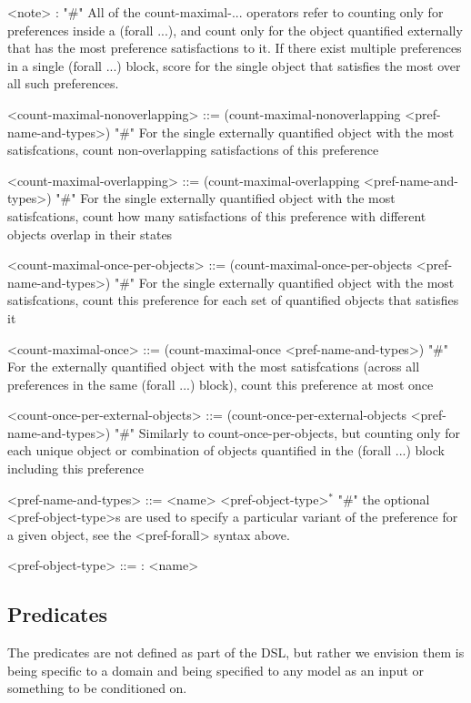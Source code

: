 \documentclass{article}
\begin{document}
\begin{grammar}
<note> : "#" All of the count-maximal-... operators refer to counting only for preferences inside a (forall ...), and count only for the object quantified externally that has the most preference satisfactions to it. If there exist multiple preferences in a single (forall ...) block, score for the single object that satisfies the most over all such preferences.

<count-maximal-nonoverlapping> ::= (count-maximal-nonoverlapping <pref-name-and-types>) "#" For the single externally quantified object with the most satisfcations, count non-overlapping satisfactions of this preference

{ \color{teal} <count-maximal-overlapping> ::= (count-maximal-overlapping <pref-name-and-types>) "#" For the single externally quantified object with the most satisfcations, count how many satisfactions of this preference with different objects overlap in their states }

<count-maximal-once-per-objects> ::= (count-maximal-once-per-objects <pref-name-and-types>) "#" For the single externally quantified object with the most satisfcations, count this preference for each set of quantified objects that satisfies it

<count-maximal-once> ::= (count-maximal-once <pref-name-and-types>) "#" For the externally quantified object with the most satisfcations (across all preferences in the same (forall ...) block), count this preference at most once

{ \color{teal} <count-once-per-external-objects> ::=  (count-once-per-external-objects <pref-name-and-types>) "#" Similarly to count-once-per-objects, but counting only for each unique object or combination of objects quantified in the (forall ...) block including this preference }

<pref-name-and-types> ::= <name> <pref-object-type>$^*$ "#" the optional <pref-object-type>s are used to specify a particular variant of the preference for a given object, see the <pref-forall> syntax above.

    <pref-object-type> ::= : <name>
    



\end{grammar}



\subsection{Predicates}
The predicates are not defined as part of the DSL, but rather we envision them is being specific to a domain and being specified to any model as an input or something to be conditioned on. \\
            
\end{document}
